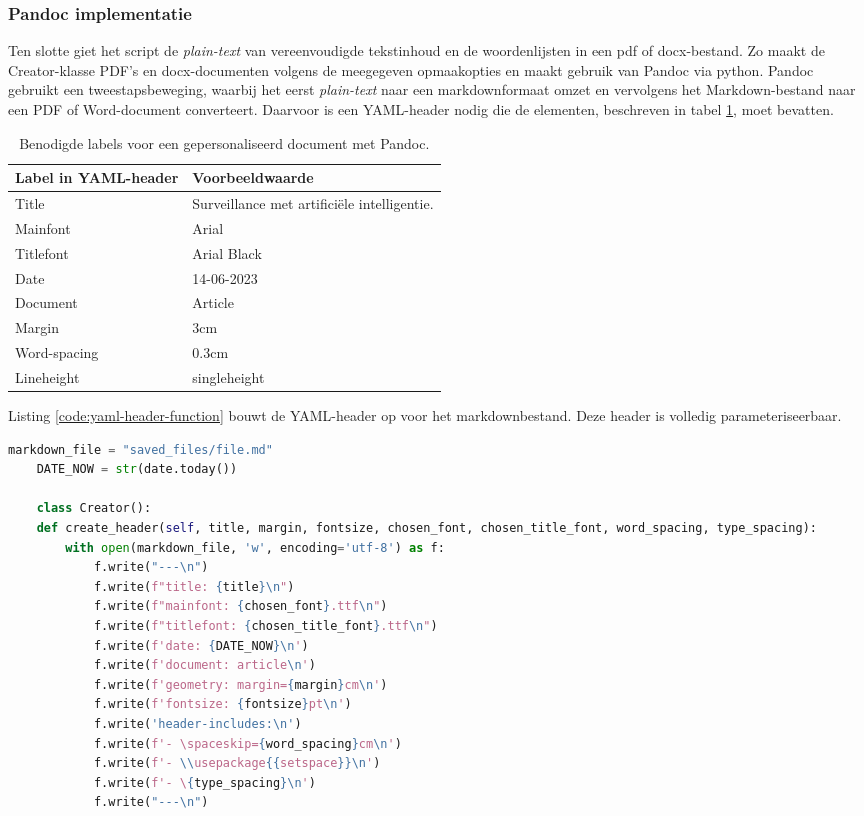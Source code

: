 \subsubsection{Pandoc implementatie}

Ten slotte giet het script de \textit{plain-text} van vereenvoudigde tekstinhoud en de woordenlijsten in een pdf of docx-bestand. Zo maakt de Creator-klasse PDF's en docx-documenten volgens de meegegeven opmaakopties en maakt gebruik van Pandoc via python.  Pandoc gebruikt een tweestapsbeweging, waarbij het eerst \textit{plain-text} naar een markdownformaat omzet en vervolgens het Markdown-bestand naar een PDF of Word-document converteert. Daarvoor is een YAML-header nodig die de elementen, beschreven in tabel \ref{table:personalized-pdf-word-document-with-pandoc}, moet bevatten.

\begin{table}[H]
	\begin{tabular}{ | m{5cm}| m{10cm} | }
		\hline
		\textbf{Label in YAML-header} & \textbf{Voorbeeldwaarde} \\ \hline
		Title & Surveillance met artificiële intelligentie. \\ \hline
		Mainfont & Arial \\ \hline 
		Titlefont & Arial Black \\ \hline
		Date & 14-06-2023 \\ \hline 
		Document & Article \\ \hline
		Margin & 3cm \\ \hline
		Word-spacing & 0.3cm \\ \hline 
		Lineheight & singleheight \\ \hline
	\end{tabular}
	\caption{Benodigde labels voor een gepersonaliseerd document met Pandoc.}
	\label{table:personalized-pdf-word-document-with-pandoc}
\end{table}

Listing \ref{code:yaml-header-function} bouwt de YAML-header op voor het markdownbestand. Deze header is volledig parameteriseerbaar.

\begin{lstlisting}[language=Python, caption={Writer-klasse omvattende de code om dynamische PDF- en Word-documenten te genereren.}, label={code:yaml-header-function}]
	markdown_file = "saved_files/file.md"
	DATE_NOW = str(date.today())
	
	class Creator():
	def create_header(self, title, margin, fontsize, chosen_font, chosen_title_font, word_spacing, type_spacing):
		with open(markdown_file, 'w', encoding='utf-8') as f:
			f.write("---\n")
			f.write(f"title: {title}\n") 
			f.write(f"mainfont: {chosen_font}.ttf\n")
			f.write(f"titlefont: {chosen_title_font}.ttf\n")
			f.write(f'date: {DATE_NOW}\n')
			f.write(f'document: article\n')
			f.write(f'geometry: margin={margin}cm\n')
			f.write(f'fontsize: {fontsize}pt\n')
			f.write('header-includes:\n')
			f.write(f'- \spaceskip={word_spacing}cm\n')
			f.write(f'- \\usepackage{{setspace}}\n')
			f.write(f'- \{type_spacing}\n')
			f.write("---\n")
\end{lstlisting}


